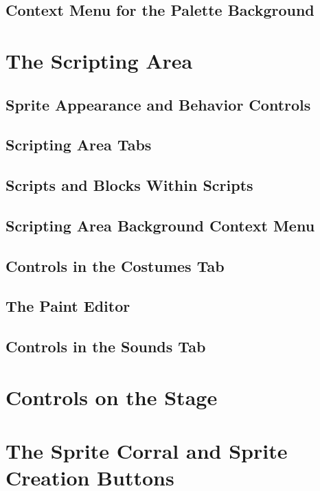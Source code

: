\documentclass{report}
\begin{document}
\subsection{Context Menu for the Palette Background}
\section{The Scripting Area}
\subsection{Sprite Appearance and Behavior Controls}
\subsection{Scripting Area Tabs}
\subsection{Scripts and Blocks Within Scripts}
\subsection{Scripting Area Background Context Menu}
\subsection{Controls in the Costumes Tab}
\subsection{The Paint Editor}
\subsection{Controls in the Sounds Tab}
\section{Controls on the Stage}
\section{The Sprite Corral and Sprite Creation Buttons}
\end{document}

